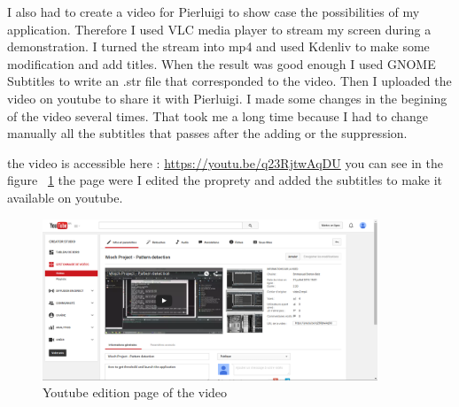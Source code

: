 	\par I also had to create a video for Pierluigi to show case the possibilities of my application. Therefore I used VLC media player to stream my screen during a demonstration. I turned the stream into mp4 and used Kdenliv to make some modification and add titles. When the result was good enough I used GNOME Subtitles to write an .str file that corresponded to the video. Then I uploaded the video on youtube to share it with Pierluigi. I made some changes in the begining of the video several times. That took me a long time because I had to change manually all the subtitles that passes after the adding or the suppression.
	\par the video is accessible here : \url{https://youtu.be/q23RjtwAqDU} you can see in the figure ~\ref{video} the page were I edited the proprety and added the subtitles to make it available on youtube.
\begin{figure}[h]
		\begin{center}
			\includegraphics[width=10cm]{images_not_compressed/screenShot.png}
			\caption{Youtube edition page of the video}
			\label{video}	
		\end{center}
	\end{figure}	